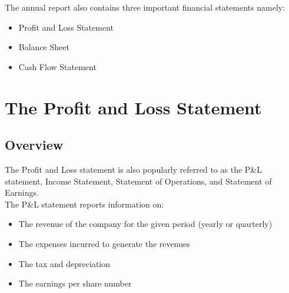 
The annual report also contains three important financial statements namely:
\begin{itemize}
  \item Profit and Loss Statement
  \item Balance Sheet
  \item Cash Flow Statement
\end{itemize}

\section{The Profit and Loss Statement}

\subsection{Overview}
The Profit and Loss statement is also popularly referred to as the P\&L statement, Income Statement, Statement of Operations, and Statement of Earnings. \\
The P\&L statement reports information on:
\begin{itemize}
  \item The revenue of the company for the given period (yearly or quarterly)
  \item The expenses incurred to generate the revenues
  \item The tax and depreciation
  \item The earnings per share number
\end{itemize}

